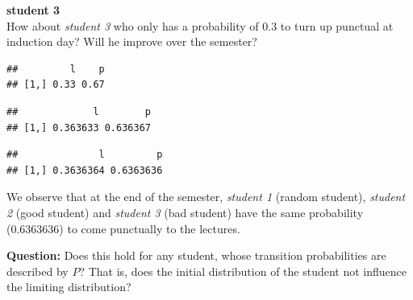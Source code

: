 \documentclass[]{article}
\newenvironment{Shaded}{\begin{snugshade}}{\end{snugshade}}
\newcommand{\CommentTok}[1]{\textcolor[rgb]{0.56,0.35,0.01}{\textit{#1}}}
\newcommand{\DecValTok}[1]{\textcolor[rgb]{0.00,0.00,0.81}{#1}}
\newcommand{\FloatTok}[1]{\textcolor[rgb]{0.00,0.00,0.81}{#1}}
\newcommand{\KeywordTok}[1]{\textcolor[rgb]{0.13,0.29,0.53}{\textbf{#1}}}
\newcommand{\NormalTok}[1]{#1}
\newcommand{\OperatorTok}[1]{\textcolor[rgb]{0.81,0.36,0.00}{\textbf{#1}}}
\newcommand{\StringTok}[1]{\textcolor[rgb]{0.31,0.60,0.02}{#1}}
\begin{document}
\textbf{student 3}\\
How about \emph{student 3} who only has a probability of \(0.3\) to turn
up punctual at induction day? Will he improve over the semester?

\begin{Shaded}
\end{Shaded}

\begin{verbatim}
##         l    p
## [1,] 0.33 0.67
\end{verbatim}

\begin{Shaded}
\end{Shaded}

\begin{verbatim}
##             l        p
## [1,] 0.363633 0.636367
\end{verbatim}

\begin{Shaded}
\end{Shaded}

\begin{verbatim}
##              l         p
## [1,] 0.3636364 0.6363636
\end{verbatim}

We observe that at the end of the semester, \emph{student 1} (random
student), \emph{student 2} (good student) and \emph{student 3} (bad
student) have the same probability (0.6363636) to come punctually to the
lectures.

\textbf{Question:} Does this hold for any student, whose transition
probabilities are described by \(P\)? That is, does the initial
distribution of the student not influence the limiting distribution?
\end{document}
